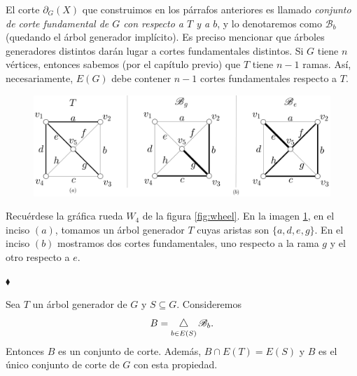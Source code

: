 El corte $\partial_{G}(X)$ que construimos en los párrafos anteriores es llamado \textit{conjunto de corte fundamental de $G$ con respecto a $T$ y a $b$}, y lo denotaremos como $\mathscr{B}_{b}$ (quedando el árbol generador implícito). Es preciso mencionar que árboles generadores distintos darán lugar a cortes fundamentales distintos. Si $G$ tiene $n$ vértices, entonces sabemos (por el capítulo previo) que $T$ tiene $n-1$ ramas. Así,  necesariamente, $E(G)$ debe contener $n-1$ cortes fundamentales respecto a $T$.  

\begin{ejem} \label{ejem:cortesfundamentales}
\begin{figure}[H]
\vspace{-1.5cm}
    \centering
    \includegraphics[scale = 0.18]{img/imgchapter2/bondminimales.jpg}
    \caption{}
    \label{fig:bondminimales}
\end{figure}


Recuérdese la gráfica rueda $W_{4}$ de la figura \ref{fig:wheel}. En la imagen \ref{fig:bondminimales}, en el inciso $(a)$, tomamos un árbol generador $T$ cuyas aristas son $\{a, d, e, g\}$. En el inciso $(b)$ mostramos dos cortes fundamentales, uno respecto a la rama $g$ y el otro respecto a $e$.


\hfill $\blacklozenge$
\end{ejem}



\begin{lema}\label{cortesfundamentalespropchida}
Sea $T$ un árbol generador de $G$ y $S\subseteq G$. Consideremos  
$$
B =\difsym_{b \in E(S)} \mathscr{B}_{b}. 
$$
Entonces $B$ es un conjunto de corte. Además, $B \cap E(T) = E(S)$ y $B$ es el único conjunto de corte de $G$ con esta propiedad.
\end{lema}

